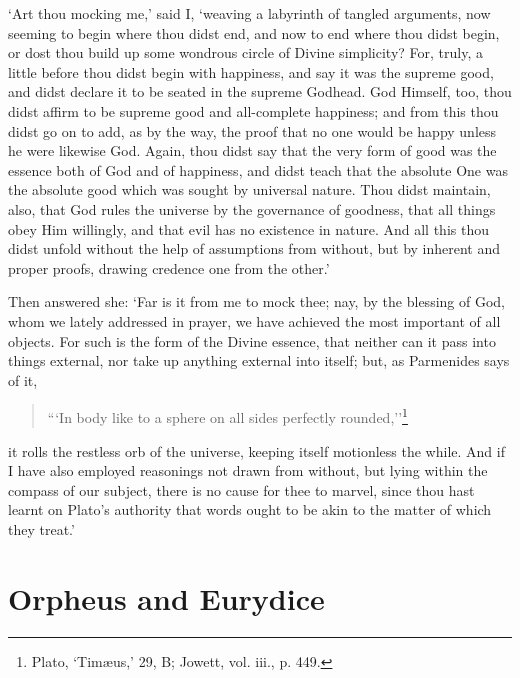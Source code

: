 \documentclass[12pt]{book}
\begin{document}
`Art thou mocking me,' said I, `weaving a labyrinth of tangled
arguments, now seeming to begin where thou didst end, and now to end
where thou didst begin, or dost thou build up some wondrous circle of
Divine simplicity? For, truly, a little before thou didst begin with
happiness, and say it was the supreme good, and didst declare it to be
seated in the supreme Godhead. God Himself, too, thou didst affirm to be
supreme good and all-complete happiness; and from this thou didst go on
to add, as by the way, the proof that no one would be happy unless he
were likewise God. Again, thou didst say that the very form of good was
the essence both of God and of happiness, and didst teach that the
absolute One was the absolute good which was sought by universal nature.
Thou didst maintain, also, that God rules the universe by the governance
of goodness, that all things obey Him willingly, and that evil has no
existence in nature. And all this thou didst unfold without the help of
assumptions from without, but by inherent and proper proofs, drawing
credence one from the other.'

Then answered she: `Far is it from me to mock thee; nay, by the blessing
of God, whom we lately addressed in prayer, we have achieved the most
important of all objects. For such is the form of the Divine essence,
that neither can it pass into things external, nor take up anything
external into itself; but, as Parmenides says of it,

\begin{quote}
  ```In body like to a sphere on all sides perfectly rounded,''\footnote{Plato, ‘Timæus,’ 29, B; Jowett, vol. iii., p. 449.}
\end{quote}

it rolls the restless orb of the universe, keeping itself motionless the
while. And if I have also employed reasonings not drawn from without,
but lying within the compass of our subject, there is no cause for thee
to marvel, since thou hast learnt on Plato's authority that words ought
to be akin to the matter of which they treat.'



\section{Orpheus and Eurydice}
\end{document}
